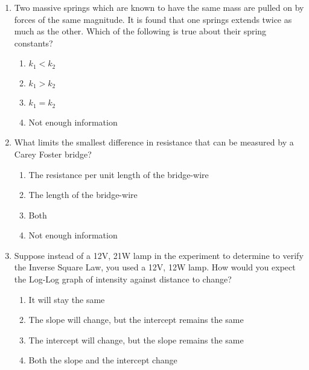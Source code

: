 \begin{enumerate}
\renewcommand{\figurename}{Figure}
\item Two massive springs which are known to have the same mass are pulled on by forces of the same magnitude. It is found that one springs extends twice as much as the other. Which of the following is true about their spring constants?
\begin{enumerate}
\item $k_1 < k_2$
\item $k_1 > k_2$
\item $k_1 = k_2$
\item Not enough information

\end{enumerate}


\item What limits the smallest difference in resistance that can be measured by a Carey Foster bridge?

\begin{enumerate}
    \item The resistance per unit length of the bridge-wire
    \item The length of the bridge-wire
    \item Both
    \item Not enough information
\end{enumerate}


\item Suppose instead of a 12V, 21W lamp in the experiment to determine to verify the Inverse Square Law, you used a 12V, 12W lamp. How would you expect the Log-Log graph of intensity against distance to change?

\begin{enumerate}
    \item It will stay the same
    \item The slope will change, but the intercept remains the same
    \item The intercept will change, but the slope remains the same
    \item Both the slope and the intercept change
\end{enumerate}





\end{enumerate}
